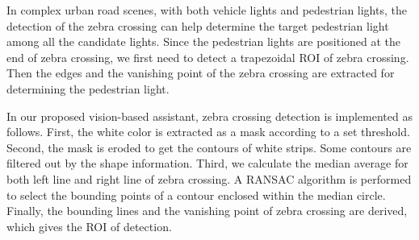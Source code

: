 In complex urban road scenes, with both vehicle lights and pedestrian lights, the detection of the zebra crossing can help determine the target pedestrian light among all the candidate lights. Since the pedestrian lights are positioned at the end of zebra crossing, we first need to detect a trapezoidal ROI of zebra crossing. Then the edges and the vanishing point of the zebra crossing are extracted for determining the pedestrian light. 


In our proposed vision-based assistant, zebra crossing detection is implemented as follows. First, the white color is extracted as a mask according to a set threshold. Second, the mask is eroded to get the contours of white strips. Some contours are filtered out by the shape information. Third, we calculate the median average for both left line and right line of zebra crossing. A RANSAC algorithm is performed to select the bounding points of a contour enclosed within the median circle. Finally, the bounding lines and the vanishing point of zebra crossing are derived, which gives the ROI of detection.




